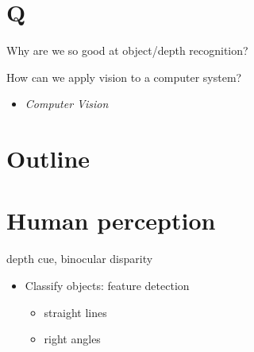 \section{Q}
\item Why are we so good at object/depth recognition?
\item How can we apply vision to a computer system?
	\begin{itemize}
		\item {\textit{Computer Vision}}
	\end{itemize}


\section{Outline}
 

\section{Human perception}
\item depth cue, binocular disparity


\begin{itemize}
\item Classify objects: feature detection
	\begin{itemize}
		\item straight lines
		\item right angles 
	\end{itemize}
\end{itemize}


